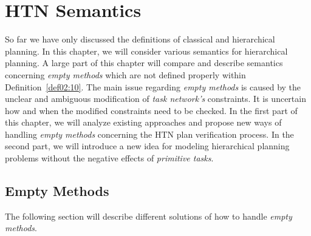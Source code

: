 \chapter{{HTN} Semantics}

\medskip\noindent
So far we have only discussed the definitions of classical and hierarchical planning. In this chapter, we will consider various semantics for hierarchical planning. A large part of this chapter will compare and describe semantics concerning \emph{empty methods} which are not defined properly within Definition~\ref{def02:10}. The main issue regarding \emph{empty methods} is caused by the unclear and ambiguous modification of \emph{task network's} constraints. It is uncertain how and when the modified constraints need to be checked. In the first part of this chapter, we will analyze existing approaches and propose new ways of handling \emph{empty methods} concerning the HTN plan verification process. In the second part, we will introduce a new idea for modeling hierarchical planning problems without the negative effects of \emph{primitive tasks}.

\section{Empty Methods}

\medskip\noindent
The following section will describe different solutions of how to handle \emph{empty methods}.

\begin{example}\label{ex03:5}
\end{example}


